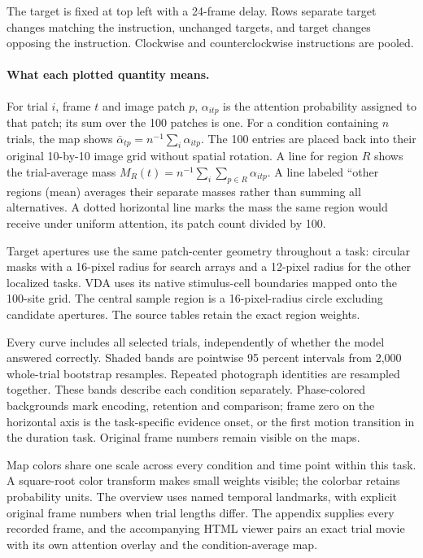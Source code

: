 \documentclass[11pt]{article}
\begin{document}
The target is fixed at top left with a 24-frame delay. Rows separate target changes matching the instruction, unchanged targets, and target changes opposing the instruction. Clockwise and counterclockwise instructions are pooled.

\paragraph{What each plotted quantity means.}
For trial $i$, frame $t$ and image patch $p$, $\alpha_{itp}$ is the attention probability assigned to that patch; its sum over the 100 patches is one. For a condition containing $n$ trials, the map shows $\bar\alpha_{tp}=n^{-1}\sum_i\alpha_{itp}$. The 100 entries are placed back into their original 10-by-10 image grid without spatial rotation. A line for region $R$ shows the trial-average mass $M_R(t)=n^{-1}\sum_i\sum_{p\in R}\alpha_{itp}$. A line labeled ``other regions (mean) averages their separate masses rather than summing all alternatives. A dotted horizontal line marks the mass the same region would receive under uniform attention, its patch count divided by 100.

Target apertures use the same patch-center geometry throughout a task: circular masks with a 16-pixel radius for search arrays and a 12-pixel radius for the other localized tasks. VDA uses its native stimulus-cell boundaries mapped onto the 100-site grid. The central sample region is a 16-pixel-radius circle excluding candidate apertures. The source tables retain the exact region weights.

Every curve includes all selected trials, independently of whether the model answered correctly. Shaded bands are pointwise 95 percent intervals from 2,000 whole-trial bootstrap resamples. Repeated photograph identities are resampled together. These bands describe each condition separately. Phase-colored backgrounds mark encoding, retention and comparison; frame zero on the horizontal axis is the task-specific evidence onset, or the first motion transition in the duration task. Original frame numbers remain visible on the maps.

Map colors share one scale across every condition and time point within this task. A square-root color transform makes small weights visible; the colorbar retains probability units. The overview uses named temporal landmarks, with explicit original frame numbers when trial lengths differ. The appendix supplies every recorded frame, and the accompanying HTML viewer pairs an exact trial movie with its own attention overlay and the condition-average map.
\end{document}
